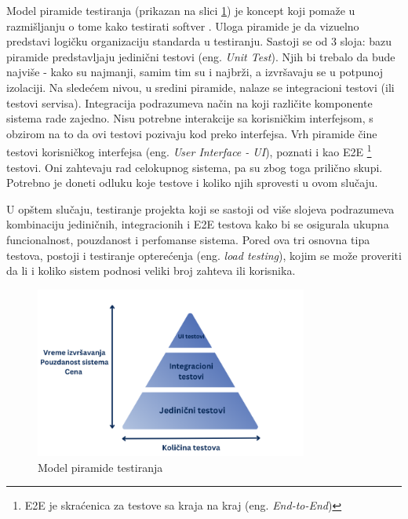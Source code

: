 \documentclass[12pt,oneside]{memoir}
\begin{document}
\par Model piramide testiranja (prikazan na slici \ref{fig:piramida}) je koncept koji pomaže u razmišljanju o tome kako testirati softver \cite{cohn}. Uloga piramide je da vizuelno predstavi logičku organizaciju standarda u testiranju. Sastoji se od 3 sloja: bazu piramide predstavljaju jedinični testovi (eng. \emph{Unit Test}). Njih bi trebalo da bude najviše - kako su najmanji, samim tim su i najbrži, a izvršavaju se u potpunoj izolaciji. Na sledećem nivou, u sredini piramide, nalaze se integracioni testovi (ili testovi servisa). Integracija podrazumeva način na koji različite komponente sistema rade zajedno. Nisu potrebne interakcije sa korisničkim interfejsom, s obzirom na to da ovi testovi pozivaju kod preko interfejsa. Vrh piramide čine testovi korisničkog interfejsa (eng. \emph{User Interface - UI}), poznati i kao E2E \footnote{E2E je skraćenica za testove sa kraja na kraj (eng. \emph{End-to-End})} testovi. Oni zahtevaju rad celokupnog sistema, pa su zbog toga prilično skupi. Potrebno je doneti odluku koje testove i koliko njih sprovesti u ovom slučaju.
\par U opštem slučaju, testiranje projekta koji se sastoji od više slojeva podrazumeva kombinaciju jediničnih, integracionih i E2E testova kako bi se osigurala ukupna funcionalnost, pouzdanost i perfomanse sistema. Pored ova tri osnovna tipa testova, postoji i testiranje opterećenja (eng.\emph{ load testing}), kojim se može proveriti da li i koliko sistem podnosi veliki broj zahteva ili korisnika. 

\begin{figure}[!ht]
  \centering
  \label{fig:piramida}
  \includegraphics[width=0.8\textwidth]{piramida.png}
  \caption{Model piramide testiranja}
\end{figure}
\end{document}
